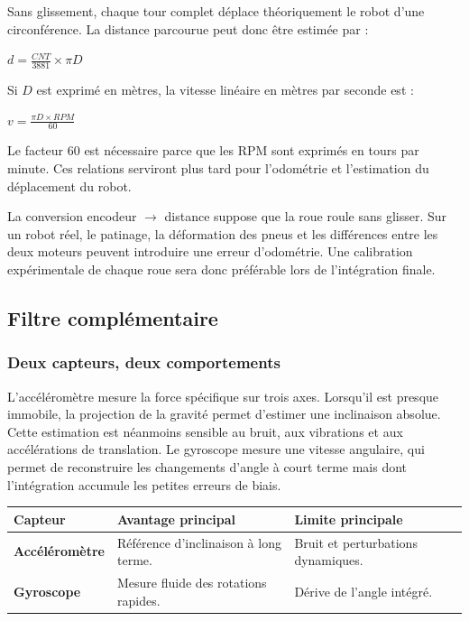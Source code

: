 \documentclass[11pt,a4paper]{article}
\begin{document}
	Sans glissement, chaque tour complet déplace théoriquement le robot d'une circonférence. La distance parcourue peut donc être estimée par :
	
	\begin{center}
		$d = \frac{CNT}{3881} \times \pi D$
	\end{center}
	
	Si $D$ est exprimé en mètres, la vitesse linéaire en mètres par seconde est :
	
	\begin{center}
		$v = \frac{\pi D \times RPM}{60}$
	\end{center}
	
	Le facteur 60 est nécessaire parce que les RPM sont exprimés en tours par minute. Ces relations serviront plus tard pour l'odométrie et l'estimation du déplacement du robot.
	
	\begin{warningbox}
		La conversion encodeur $\rightarrow$ distance suppose que la roue roule sans glisser. Sur un robot réel, le patinage, la déformation des pneus et les différences entre les deux moteurs peuvent introduire une erreur d'odométrie. Une calibration expérimentale de chaque roue sera donc préférable lors de l'intégration finale.
	\end{warningbox}
	
	\subsection*{Filtre complémentaire}
	
	\subsubsection*{Deux capteurs, deux comportements}
	
	L'accéléromètre mesure la force spécifique sur trois axes. Lorsqu'il est presque immobile, la projection de la gravité permet d'estimer une inclinaison absolue. Cette estimation est néanmoins sensible au bruit, aux vibrations et aux accélérations de translation. Le gyroscope mesure une vitesse angulaire, qui permet de reconstruire les changements d'angle à court terme mais dont l'intégration accumule les petites erreurs de biais.
	
	\begin{center}
		\begin{tabular}{>{\bfseries}p{3cm}p{4.8cm}p{4.8cm}}
			\toprule
			Capteur & Avantage principal & Limite principale \\
			\midrule
			Accéléromètre & Référence d'inclinaison à long terme. & Bruit et perturbations dynamiques. \\
			Gyroscope & Mesure fluide des rotations rapides. & Dérive de l'angle intégré. \\
			\bottomrule
		\end{tabular}
	\end{center}
	
\end{document}
